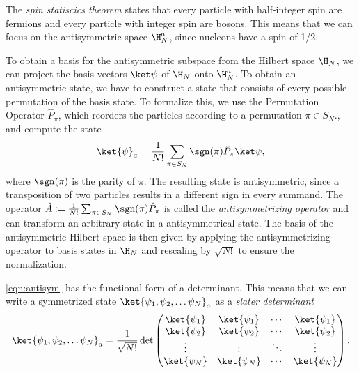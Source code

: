The \textit{spin statiscics theorem} states that every particle with half-integer spin are fermions and every particle with integer spin are bosons. This means that we can focus on the antisymmetric space $\H_N^a$, since nucleons have a spin of 1/2.

To obtain a basis for the antisymmetric subspace from the Hilbert space $\H_N$, we can project the basis vectors $\ket\psi$ of $\H_N$ onto $\H_N^a$. To obtain an antisymmetric state, we have to construct a state that consists of every possible permutation of the basis state. To formalize this, we use the Permutation Operator $\hat{P}_\pi$, which reorders the particles according to a permutation $\pi \in S_N$., and compute the state
\begin{equation}
  \label{eqn:antisym}
  \ket{\psi}_a = \frac{1}{N!} \sum_{\pi \in S_N} \sgn(\pi) \hat{P}_\pi \ket\psi,
\end{equation}
where $\sgn(\pi)$ is the parity of $\pi$.
The resulting state is antisymmetric, since a transposition of two particles results in a different sign in every summand. The operator $\hat{A} := \frac{1}{N!}\sum_{\pi \in S_N} \sgn(\pi) \hat{P}_\pi$ is called the \textit{antisymmetrizing operator} and can transform an arbitrary state in a antisymmetrical state.
The basis of the antisymmetric Hilbert space is then given by applying the antisymmetrizing operator to basis states in $\H_N$ and rescaling by $\sqrt{N!}$ to ensure the normalization.

\eqref{eqn:antisym} has the functional form of a determinant. This means that we can write a symmetrized state $\ket{\psi_1, \psi_2,  \dots \psi_N}_a$ as a \textit{slater determinant}
\begin{equation}
  \ket{\psi_1, \psi_2,  \dots \psi_N}_a = \frac{1}{\sqrt{N!}}\det
  \begin{pmatrix}
    \ket{\psi_1} & \ket{\psi_1} & \cdots & \ket{\psi_1} \\
    \ket{\psi_2} & \ket{\psi_2} & \cdots & \ket{\psi_2} \\
    \vdots       & \vdots       & \ddots & \vdots       \\
    \ket{\psi_N} & \ket{\psi_N} & \cdots & \ket{\psi_N} \\
  \end{pmatrix}.
\end{equation}
